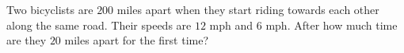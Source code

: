 Two bicyclists are $200$ miles apart when they start riding towards each other along the same road. Their speeds are $12$ mph and $6$ mph. After how much time are they $20$ miles apart for the first time?
